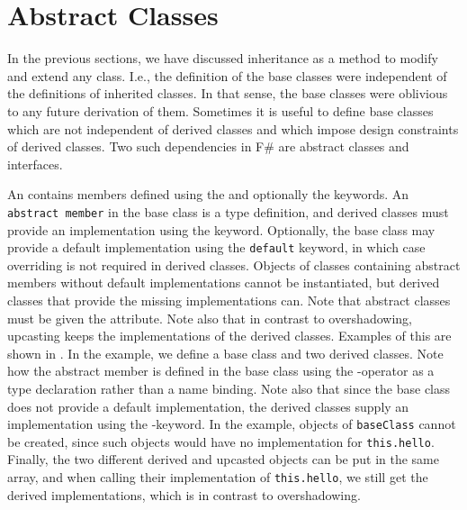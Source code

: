 \documentclass[fsharpNotes.tex]{subfiles}
\begin{document}
\section{Abstract Classes}
\label{sec:abstract}
In the previous sections, we have discussed inheritance as a method to modify and extend any class. I.e., the definition of the base classes were independent of the definitions of inherited classes. In that sense, the base classes were oblivious to any future derivation of them. Sometimes it is useful to define base classes which are not independent of derived classes and which impose design constraints of derived classes. Two such dependencies in F\# are abstract classes and interfaces.

 An  contains members defined using the  and optionally the  keywords. An \lstinline{abstract member} in the base class is a type definition, and derived classes must provide an implementation using the  keyword. Optionally, the base class may provide a default implementation using the \lstinline{default} keyword, in which case overriding is not required in derived classes. Objects of classes containing abstract members without default implementations cannot be instantiated, but derived classes that provide the missing implementations can. Note that abstract classes must be given the  attribute. Note also that in contrast to overshadowing, upcasting keeps the implementations of the derived classes. Examples of this are shown in .
%
%
In the example, we define a base class and two derived classes. Note how the abstract member is defined in the base class using the \lexeme{:}-operator as a type declaration rather than a name binding. Note also that since the base class does not provide a default implementation, the derived classes supply an implementation using the -keyword. In the example, objects of \lstinline{baseClass} cannot be created, since such objects would have no implementation for \lstinline{this.hello}. Finally, the two different derived and upcasted objects can be put in the same array, and when calling their implementation of \lstinline{this.hello}, we still get the derived implementations, which is in contrast to overshadowing.
\end{document}
